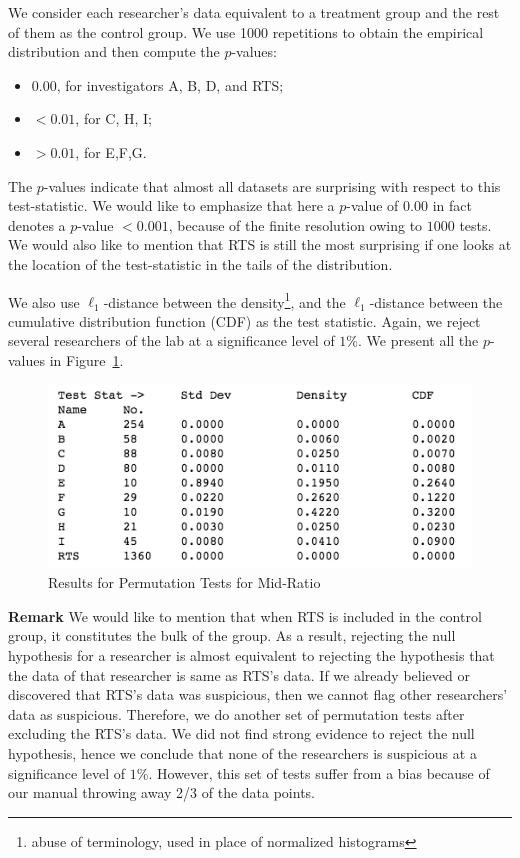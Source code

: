 \documentclass{article}
\begin{document}
We consider each researcher's data equivalent to a treatment group and the rest of them as the control group. 
We use 1000 repetitions to obtain the empirical
distribution and then compute the $p$-values: 
\begin{itemize} 
	\item $0.00$, for investigators A, B,
	D, and RTS;
	\item \(<0.01\), for C, H, I;
	\item  \(>0.01\), for  E,F,G.
\end{itemize}
 The $p$-values indicate that almost all datasets are surprising with respect to this
test-statistic. 
We would like to emphasize that here a $p$-value of $0.00$ in fact denotes a $p$-value $<0.001$, because of the finite resolution owing to $1000$ tests.
We would also like to mention that RTS is still the most surprising if one looks at the location of the test-statistic in the tails of the distribution.

We also use \(\ell_1\)-distance between the density\footnote{abuse of terminology, used in place of normalized histograms}, and the
\(\ell_1\)-distance between the cumulative distribution function (CDF) as the test statistic. Again, we reject several researchers of the lab at a significance level of \(1 \%\). 
We present all the $p$-values in Figure~\ref{mid_ratio_perm}.

\begin{figure}[H]
\centering
\includegraphics[width=0.8\linewidth]{images/mid_ratio_perm.png}
\caption{Results for Permutation Tests for Mid-Ratio}
\label{mid_ratio_perm}
\end{figure}

{\bf Remark} We would like to mention that when RTS is included in the control group, it constitutes the bulk of the group. As a result, rejecting the null hypothesis for a researcher is almost equivalent to rejecting the hypothesis that the data of that researcher is same as RTS's data. 
If we already believed or discovered that RTS's data was suspicious, then we cannot flag other researchers' data as suspicious. 
Therefore, we do another set of permutation tests after excluding the RTS's data. 
We did not find strong evidence to reject the null hypothesis, hence we conclude that none of the researchers is suspicious at a significance level of $1\%$. 
However, this set of tests suffer from a bias because of our manual throwing away 2/3 of the data points.
\end{document}
